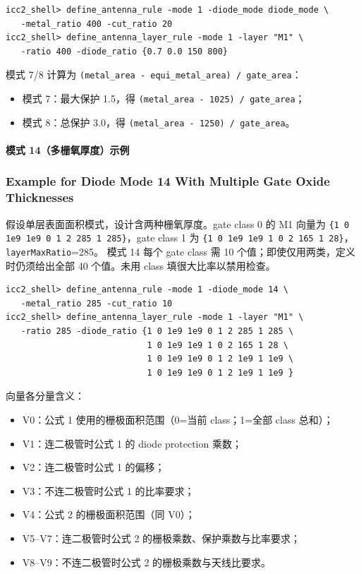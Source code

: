 \begin{lstlisting}
icc2_shell> define_antenna_rule -mode 1 -diode_mode diode_mode \
   -metal_ratio 400 -cut_ratio 20
icc2_shell> define_antenna_layer_rule -mode 1 -layer "M1" \
   -ratio 400 -diode_ratio {0.7 0.0 150 800}
\end{lstlisting}

模式 7/8 计算为 \texttt{(metal\_area - equi\_metal\_area) / gate\_area}：
\begin{itemize}
  \item 模式 7：最大保护 1.5，得 \texttt{(metal\_area - 1025) / gate\_area}；
  \item 模式 8：总保护 3.0，得 \texttt{(metal\_area - 1250) / gate\_area}。
\end{itemize}

\paragraph{模式 14（多栅氧厚度）示例}
\subsubsection*{Example for Diode Mode 14 With Multiple Gate Oxide Thicknesses}

假设单层表面面积模式，设计含两种栅氧厚度。gate class 0 的 M1 向量为
\texttt{\{1 0 1e9 1e9 0 1 2 285 1 285\}}，gate class 1 为
\texttt{\{1 0 1e9 1e9 1 0 2 165 1 28\}}，\texttt{layerMaxRatio}=285。
模式 14 每个 gate class 需 10 个值；即使仅用两类，定义时仍须给出全部 40 个值。未用 class 填很大比率以禁用检查。

\begin{lstlisting}
icc2_shell> define_antenna_rule -mode 1 -diode_mode 14 \
   -metal_ratio 285 -cut_ratio 10
icc2_shell> define_antenna_layer_rule -mode 1 -layer "M1" \
   -ratio 285 -diode_ratio {1 0 1e9 1e9 0 1 2 285 1 285 \
                            1 0 1e9 1e9 1 0 2 165 1 28 \
                            1 0 1e9 1e9 0 1 2 1e9 1 1e9 \
                            1 0 1e9 1e9 0 1 2 1e9 1 1e9 }
\end{lstlisting}

向量各分量含义：
\begin{itemize}
  \item V0：公式 1 使用的栅极面积范围（0=当前 class；1=全部 class 总和）；
  \item V1：连二极管时公式 1 的 diode protection 乘数；
  \item V2：连二极管时公式 1 的偏移；
  \item V3：不连二极管时公式 1 的比率要求；
  \item V4：公式 2 的栅极面积范围（同 V0）；
  \item V5--V7：连二极管时公式 2 的栅极乘数、保护乘数与比率要求；
  \item V8--V9：不连二极管时公式 2 的栅极乘数与天线比要求。
\end{itemize}

